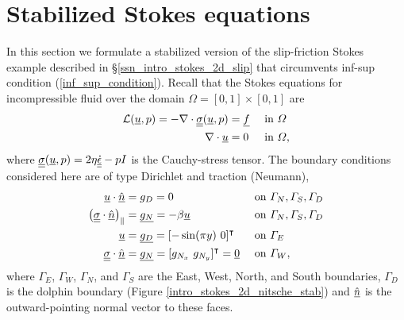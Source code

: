 
\section{Stabilized Stokes equations} \label{ssn_intro_stokes_2d_slip_stab}

In this section we formulate a stabilized version of the slip-friction Stokes example described in \S \ref{ssn_intro_stokes_2d_slip} that circumvents inf-sup condition (\ref{inf_sup_condition}).  Recall that the Stokes equations for incompressible fluid over the domain $\Omega = [0,1] \times [0,1]$ are
\begin{align}
  \label{intro_stokes_stab_momentum}
  \mathcal{L} (\underline{u}, p) = -\nabla \cdot \underline{\underline{\sigma}}(\underline{u}, p) &= \underline{f} &&\text{ in } \varOmega \\
  \label{intro_stokes_stab_mass}
  \nabla \cdot \underline{u} &= 0 &&\text{ in } \varOmega,
\end{align}
where $\underline{\underline{\sigma}}(\underline{u}, p) = 2\eta\underline{\underline{\dot{\epsilon}}} - pI$ is the Cauchy-stress tensor.  The boundary conditions considered here are of type Dirichlet and traction (Neumann),
\begin{align}
  \label{intro_stokes_stab_gD_N_S_D_slip}
  \rankone{u} \cdot \normal &= g_D = 0 &&\text{ on } \Gamma_N, \Gamma_S, \Gamma_D \\
  \label{intro_stokes_stab_gN_N_S_D_fric}
  \left( \ranktwo{\sigma} \cdot \normal \right)_{\Vert} &= \rankone{g_N} = -\beta \rankone{u} &&\text{ on } \Gamma_N, \Gamma_S, \Gamma_D \\
  \label{intro_stokes_stab_gD_E}
  \rankone{u} &= \rankone{g_D} = [-\sin(\pi y)\ 0]\T &&\text{ on } \Gamma_E \\
  \label{intro_stokes_stab_gN}
  \ranktwo{\sigma} \cdot \normal &= \rankone{g_N} = [g_{N_x}\ g_{N_y}]\T = \rankone{0} &&\text{ on } \Gamma_W,
\end{align}
where $\Gamma_E$, $\Gamma_W$, $\Gamma_N$, and $\Gamma_S$ are the East, West, North, and South boundaries, $\Gamma_D$ is the dolphin boundary (Figure \ref{intro_stokes_2d_nitsche_stab}) and $\underline{\hat{n}}$ is the outward-pointing normal vector to these faces.

